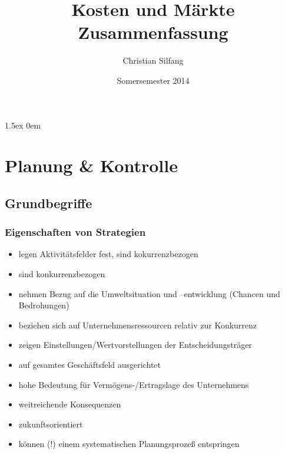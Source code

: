 \documentclass[a4paper,11pt, twoside]{article}
\begin{document}
\title{
\textbf{Kosten und Märkte}\\
Zusammenfassung
}

\author{Christian Silfang}
\date{Somersemester 2014}

\parskip1.5ex
\parindent0em

\pagestyle{empty}
\maketitle
\thispagestyle{empty}
\cleardoublepage


\tableofcontents
\cleardoublepage

\pagestyle{fancy}
	\renewcommand{\sectionmark}[1]{\markboth{#1}{}}
	\fancyhf{}
	\fancyhead[EL]{\thesection { }\leftmark}
	\fancyhead[OR]{{ }\rightmark}
	\renewcommand{\headrulewidth}{0.4pt}
	
  \fancyfoot[EL]{\textbf{\thepage}}
	\fancyfoot[OR]{\textbf{\thepage}} 
	
	\setcounter{page}{1}

\section{Planung \& Kontrolle}

\subsection{Grundbegriffe}

\subsubsection*{Eigenschaften von Strategien}
\begin{itemize}
	\item legen Aktivitätsfelder fest, sind kokurrenzbezogen
	\item sind konkurrenzbezogen
	\item nehmen Bezug auf die Umweltsituation und –entwicklung (Chancen und Bedrohungen)
	\item beziehen sich auf Unternehmensressourcen relativ zur Konkurrenz
	\item zeigen Einstellungen/Wertvorstellungen der Entscheidungsträger
	\item auf gesamtes Geschäftsfeld ausgerichtet
	\item hohe Bedeutung für Vermögens-/Ertragslage des Unternehmens
	\item weitreichende Konsequenzen
	\item zukunftsorientiert
	\item können (!) einem systematischen Planungsprozeß entspringen
\end{itemize}
\end{document}
